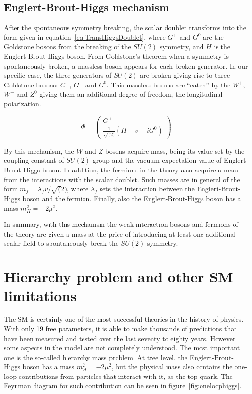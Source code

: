 \subsection{Englert-Brout-Higgs mechanism}
\label{sec:higgs}

After the spontaneous symmetry breaking, the scalar doublet transforms into the form given in equation~\ref{eq:TransHiggsDoublet}, where $G^{+}$ and $G^{0}$ are the Goldstone bosons from the breaking of the $SU(2)$ symmetry, and $H$ is the Englert-Brout-Higgs boson. From Goldstone's theorem when a symmetry is spontaneously broken, a massless boson appears for each broken generator. In our specific case, the three generators of $SU(2)$ are broken giving rise to three Goldstone bosons: $G^{+}$, $G^{-}$ and $G^{0}$. This massless bosons are ``eaten'' by the $W^{+}$, $W^{-}$ and $Z^{0}$ giving them an additional degree of freedom, the longitudinal polarization. 

\begin{equation}
  \label{eq:TransHiggsDoublet}
  \Phi=\left(
    \begin{array}{c}
      G^{+} \\
      \frac{1}{\sqrt(2)}(H+v-iG^{0})
    \end{array}
  \right)
\end{equation}

By this mechanism, the $W$ and $Z$ bosons acquire mass, being its value set by the coupling constant of $SU(2)$ group and the vacuum expectation value of Englert-Brout-Higgs boson. In addition, the fermions in the theory also acquire a mass from the interactions with the scalar doublet. Such masses are in general of the form $m_{f}=\lambda_{f}v/\sqrt(2)$, where $\lambda_{f}$ sets the interaction between the Englert-Brout-Higgs boson and the fermion. Finally, also the Englert-Brout-Higgs boson has a mass $m_{H}^{2}=-2\mu^{2}$.

In summary, with this mechanism the weak interaction bosons and fermions of the theory are given a mass at the price of introducing at least one additional scalar field to spontaneously break the $SU(2)$ symmetry.

\section{Hierarchy problem and other SM limitations}
\label{sec:hier}

The SM is certainly one of the most successful theories in the history of physics. With only 19 free parameters, it is able to make thousands of predictions that have been measured and tested over the last seventy to eighty years. However some aspects in the model are not completely understood. The most important one is the so-called hierarchy mass problem. At tree level, the Englert-Brout-Higgs boson has a mass $m_{H}^{2}=-2\mu^{2}$, but the physical mass also contains the one-loop contributions from particles that interact with it, as the top quark. The Feynman diagram for such contribution can be seen in figure~\ref{fig:oneloophiggs}.

